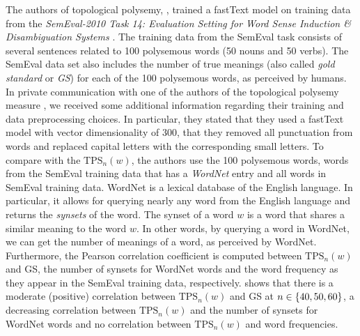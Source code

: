 The authors of topological polysemy, \cite{jakubowski2020topology}, trained a fastText model on training data from the \textit{SemEval-2010 Task 14: Evaluation Setting for Word Sense Induction \& Disambiguation Systems} \cite{manandhar-klapaftis-2009-semeval}. The training data from the SemEval task consists of several sentences related to 100 polysemous words (50 nouns and 50 verbs). The SemEval data set also includes the number of true meanings (also called \textit{gold standard} or \textit{GS}) for each of the 100 polysemous words, as perceived by humans. In private communication with one of the authors of the topological polysemy measure \cite{ZibrowiusPrivComs2021}, we received some additional information regarding their training and data preprocessing choices. In particular, they stated that they used a fastText model with vector dimensionality of 300, that they removed all punctuation from words and replaced capital letters with the corresponding small letters. To compare with the $\text{TPS}_n(w)$, the authors use the 100 polysemous words, words from the SemEval training data that has a \textit{WordNet} \cite{fellbaum1998} entry and all words in SemEval training data. WordNet is a lexical database of the English language. In particular, it allows for querying nearly any word from the English language and returns the \textit{synsets} of the word. The synset of a word $w$ is a word that shares a similar meaning to the word $w$. In other words, by querying a word in WordNet, we can get the number of meanings of a word, as perceived by WordNet. Furthermore, the Pearson correlation coefficient \cite{James2013} is computed between $\text{TPS}_n(w)$ and GS, the number of synsets for WordNet words and the word frequency as they appear in the SemEval training data, respectively. \cite{jakubowski2020topology} shows that there is a moderate (positive) correlation between $\text{TPS}_n(w)$ and GS at $n \in \left\{40, 50, 60\right\}$, a decreasing correlation between $\text{TPS}_n(w)$ and the number of synsets for WordNet words and no correlation between $\text{TPS}_n(w)$ and word frequencies.

